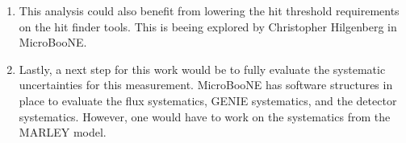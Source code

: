 \begin{enumerate}
 \item This analysis could also benefit from lowering the hit threshold requirements on the hit finder tools. This is beeing explored by Christopher Hilgenberg in MicroBooNE. 
 
 \item Lastly, a next step for this work would be to fully evaluate the systematic uncertainties for this measurement. MicroBooNE has software structures in place to evaluate the flux systematics, GENIE systematics, and the detector systematics. However, one would have to work on the systematics from the MARLEY model. 
\end{enumerate}
